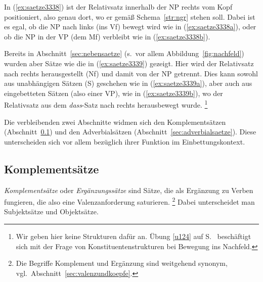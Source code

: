 \begin{exe}
  \ex\label{ex:saetze3338}
  \begin{xlist}
  \end{xlist}
  \ex\label{ex:saetze3339}
  \begin{xlist}
  \end{xlist}
\end{exe}

In (\ref{ex:saetze3338}) ist der Relativsatz innerhalb der NP rechts vom Kopf positioniert, also genau dort, wo er gemäß Schema~\ref{str:ngr} stehen soll.
Dabei ist es egal, ob die NP nach links (ins Vf) bewegt wird wie in (\ref{ex:saetze3338a}), oder ob die NP in der VP (dem Mf) verbleibt wie in (\ref{ex:saetze3338b}).

Bereits in Abschnitt~\ref{sec:nebensaetze} (s.\ vor allem Abbildung~\ref{fig:nachfeld}) wurden aber Sätze wie die in (\ref{ex:saetze3339}) gezeigt.
Hier wird der Relativsatz nach rechts herausgestellt (Nf) und damit von der NP getrennt.
Dies kann sowohl aus unabhängigen Sätzen (S) geschehen wie in (\ref{ex:saetze3339a}), aber auch aus eingebetteten Sätzen (also einer VP), wie in (\ref{ex:saetze3339b}), wo der Relativsatz aus dem \textit{dass}-Satz nach rechts herausbewegt wurde.%
\footnote{Wir geben hier keine Strukturen dafür an.
Übung \ref{u124} auf S.~\pageref{u124} beschäftigt sich mit der Frage von Konstituentenstrukturen bei Bewegung ins Nachfeld.}

Die verbleibenden zwei Abschnitte widmen sich den Komplementsätzen (Abschnitt~\ref{sec:komplementsaetze}) und den Adverbialsätzen (Abschnitt~\ref{sec:adverbialsaetze}).
Diese unterscheiden sich vor allem bezüglich ihrer Funktion im Einbettungskontext.

\subsection{Komplementsätze}

\label{sec:komplementsaetze}


\textit{Komplementsätze} oder \textit{Ergänzungssätze} sind Sätze, die als Ergänzung zu Verben fungieren, die also eine Valenzanforderung saturieren.%
\footnote{Die Begriffe Komplement und Ergänzung sind weitgehend synonym, vgl.\ Abschnitt~\ref{sec:valenzundkoepfe}.}
Dabei unterscheidet man Subjektsätze und Objektsätze.

